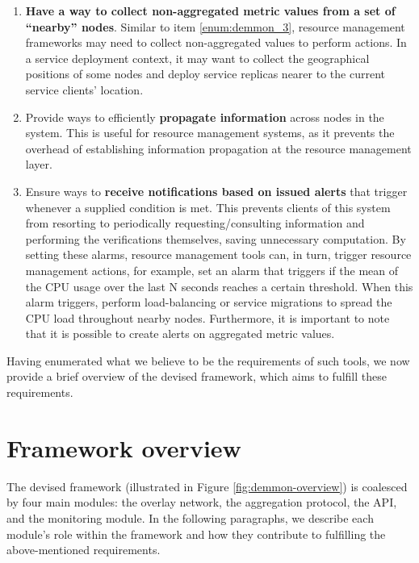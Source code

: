 \begin{enumerate}
    \item \textbf{Have a way to collect non-aggregated metric values from a set of ``nearby'' nodes}. Similar to item \ref{enum:demmon_3}, resource management frameworks may need to collect non-aggregated values to perform actions. In a service deployment context, it may want to collect the geographical positions of some nodes and deploy service replicas nearer to the current service clients' location. \label{enum:demmon_7}
    
    \item Provide ways to efficiently \textbf{propagate information} across nodes in the system. This is useful for resource management systems, as it prevents the overhead of establishing information propagation at the resource management layer. \label{enum:demmon_5}
    
    \item Ensure ways to \textbf{receive notifications based on issued alerts} that trigger whenever a supplied condition is met. This prevents clients of this system from resorting to periodically requesting/consulting information and performing the verifications themselves, saving unnecessary computation. By setting these alarms, resource management tools can, in turn, trigger resource management actions, for example, set an alarm that triggers if the mean of the CPU usage over the last N seconds reaches a certain threshold. When this alarm triggers, perform load-balancing or service migrations to spread the CPU load throughout nearby nodes. Furthermore, it is important to note that it is possible to create alerts on aggregated metric values. \label{enum:demmon_6}
    
\end{enumerate}

Having enumerated what we believe to be the requirements of such tools, we now provide a brief overview of the devised framework, which aims to fulfill these requirements. 

\section{Framework overview}
\label{sec:framework_overview}


The devised framework (illustrated in Figure \ref{fig:demmon-overview}) is coalesced by four main modules: the overlay network, the aggregation protocol, the API, and the monitoring module. In the following paragraphs, we describe each module's role within the framework and how they contribute to fulfilling the above-mentioned requirements.

